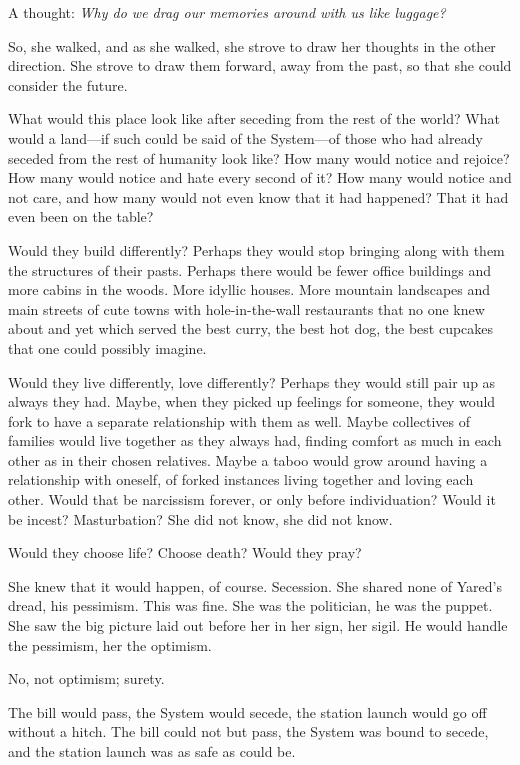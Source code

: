 A thought: \emph{Why do we drag our memories around with us like luggage?}

So, she walked, and as she walked, she strove to draw her thoughts in the other direction. She strove to draw them forward, away from the past, so that she could consider the future.

What would this place look like after seceding from the rest of the world? What would a land---if such could be said of the System---of those who had already seceded from the rest of humanity look like? How many would notice and rejoice? How many would notice and hate every second of it? How many would notice and not care, and how many would not even know that it had happened? That it had even been on the table?

Would they build differently? Perhaps they would stop bringing along with them the structures of their pasts. Perhaps there would be fewer office buildings and more cabins in the woods. More idyllic houses. More mountain landscapes and main streets of cute towns with hole-in-the-wall restaurants that no one knew about and yet which served the best curry, the best hot dog, the best cupcakes that one could possibly imagine.

Would they live differently, love differently? Perhaps they would still pair up as always they had. Maybe, when they picked up feelings for someone, they would fork to have a separate relationship with them as well. Maybe collectives of families would live together as they always had, finding comfort as much in each other as in their chosen relatives. Maybe a taboo would grow around having a relationship with oneself, of forked instances living together and loving each other. Would that be narcissism forever, or only before individuation? Would it be incest? Masturbation? She did not know, she did not know.

Would they choose life? Choose death? Would they pray?

She knew that it would happen, of course. Secession. She shared none of Yared's dread, his pessimism. This was fine. She was the politician, he was the puppet. She saw the big picture laid out before her in her sign, her sigil. He would handle the pessimism, her the optimism.

No, not optimism; surety.

The bill would pass, the System would secede, the station launch would go off without a hitch. The bill could not but pass, the System was bound to secede, and the station launch was as safe as could be.

